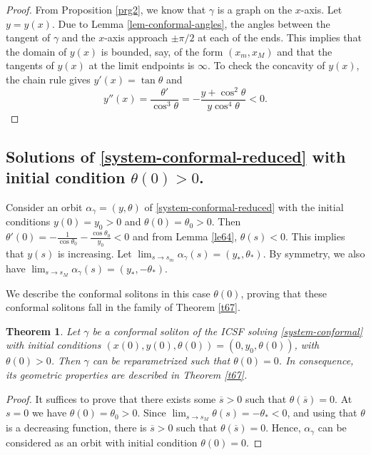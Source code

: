 \documentclass[12pt]{amsart}
\theoremstyle{plain}
\newtheorem{theorem}{Theorem}[section]
\theoremstyle{definition}
\begin{document}
\begin{proof}
 From Proposition \ref{prg2}, we know that $\gamma$  is a graph on the $x$-axis. Let $y=y(x)$.   Due to Lemma \ref{lem-conformal-angles}, the angles between the tangent of $\gamma$ and the $x$-axis approach $\pm \pi/2$ at each of the ends. This implies that the domain of $y (x)$ is bounded, say,  of the form $(x_m, x_M)$ and that the tangents of $y(x)$ at the limit endpoints is $\infty$. To check the concavity of $y(x)$, the chain rule gives $y'(x)=\tan\theta$ and 
 $$y''(x)=\frac{\theta'}{\cos^3\theta}=-\frac{y+\cos^2\theta}{y\cos^4\theta}<0.$$
\end{proof}

\subsection{Solutions of \eqref{system-conformal-reduced} with initial condition $\theta(0)> 0$.}

Consider  an orbit  $\alpha_\gamma = (y,\theta)$   of   \eqref{system-conformal-reduced} with the initial conditions $y(0) = y_0 > 0$ and $\theta(0) = \theta_0 > 0$. Then  $\theta'(0) = - \frac{1}{\cos\theta_0} - \frac{\cos\theta_0}{y_0} < 0$ and from Lemma \ref{le64}, $\theta(s)<0$. This implies that $y(s)$ is  increasing. Let $\lim_{s \to s_m} \alpha_\gamma(s) = (y_\ast, \theta_\ast)$. By   symmetry, we also have $\lim_{s \to s_M} \alpha_\gamma(s) = (y_\ast, - \theta_\ast)$.


We describe the conformal solitons in this case $\theta(0)$, proving that these conformal solitons fall in the family of Theorem \ref{t67}.  

\begin{theorem}
   Let $\gamma$  be a conformal soliton of the ICSF solving \eqref{system-conformal} with initial conditions $(x(0),y(0),\theta(0))=(0,y_0,\theta(0))$, with $\theta(0)>0$. Then  $\gamma$  can be reparametrized such that $\theta(0)=0$. In consequence, its geometric properties are described in Theorem \ref{t67}. 
 \end{theorem} 
\begin{proof}
It suffices to prove that there exists some $\overline{s} > 0$ such that $\theta(\overline{s}) = 0$.
    At $s = 0$ we have $\theta(0) = \theta_0 > 0$. Since $\lim_{s \to s_M} \theta(s) = - \theta_\ast < 0$, and using that $\theta$ is a decreasing function, there is   $\overline{s} > 0$ such that $\theta(\overline{s}) = 0$. Hence, $\alpha_\gamma$ can be considered as an orbit with initial condition $\theta(0) = 0$.  
\end{proof}
\end{document}
